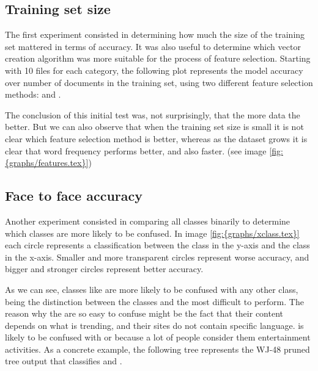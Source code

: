 \subsection{Training set size}
The first experiment consisted in determining how much the size of the training set mattered in terms of accuracy. It was also useful to determine which vector creation algorithm was
more suitable for the process of feature selection. Starting with 10 files for each category, the following plot represents the model accuracy over number of documents in the training set, 
using two different feature selection methods:  and .

 
The conclusion of this initial test was, not surprisingly, that the more data the better. But we can also observe that when the training set size is small it is not clear which feature selection 
method is better, whereas as the dataset grows it is clear that word frequency performs better, and also faster. (see image \ref{fig:{graphs/features.tex}})

\subsection{Face to face accuracy}
Another experiment consisted in comparing all classes binarily to determine which classes are more likely to be confused. In image \ref{fig:{graphs/xclass.tex}} each circle represents a classification 
between the class in the y-axis and the class in the x-axis. Smaller and more transparent circles represent worse accuracy, and bigger and stronger circles represent better accuracy. 

As we can see, classes like  are more likely to be confused with any other class, being the distinction between the classes  and  the most
difficult to perform. The reason why the  are so easy to confuse might be the fact that their content depends on what is trending, and their sites do not contain specific language.
 is likely to be confused with  or  because a lot of people consider them entertainment activities. 
As a concrete example, the following tree represents the WJ-48 pruned tree output that classifies  and .

